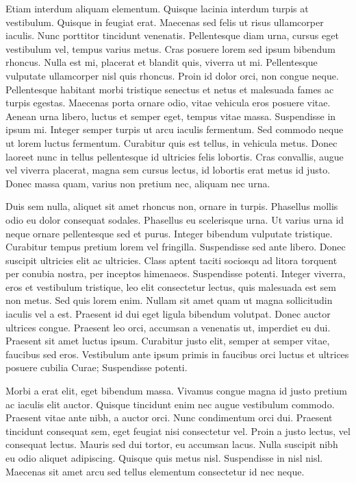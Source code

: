 Etiam interdum aliquam elementum.
Quisque lacinia interdum turpis at vestibulum.
Quisque in feugiat erat.
Maecenas sed felis ut risus ullamcorper iaculis.
Nunc porttitor tincidunt venenatis.
Pellentesque diam urna, cursus eget vestibulum vel, tempus varius metus.
Cras posuere lorem sed ipsum bibendum rhoncus.
Nulla est mi, placerat et blandit quis, viverra ut mi.
Pellentesque vulputate ullamcorper nisl quis rhoncus.
Proin id dolor orci, non congue neque.
Pellentesque habitant morbi tristique senectus et netus et malesuada fames ac turpis egestas.
Maecenas porta ornare odio, vitae vehicula eros posuere vitae.
Aenean urna libero, luctus et semper eget, tempus vitae massa.
Suspendisse in ipsum mi.
Integer semper turpis ut arcu iaculis fermentum.
Sed commodo neque ut lorem luctus fermentum.
Curabitur quis est tellus, in vehicula metus.
Donec laoreet nunc in tellus pellentesque id ultricies felis lobortis.
Cras convallis, augue vel viverra placerat, magna sem cursus lectus, id lobortis erat metus id justo.
Donec massa quam, varius non pretium nec, aliquam nec urna.

Duis sem nulla, aliquet sit amet rhoncus non, ornare in turpis.
Phasellus mollis odio eu dolor consequat sodales.
Phasellus eu scelerisque urna.
Ut varius urna id neque ornare pellentesque sed et purus.
Integer bibendum vulputate tristique.
Curabitur tempus pretium lorem vel fringilla.
Suspendisse sed ante libero.
Donec suscipit ultricies elit ac ultricies.
Class aptent taciti sociosqu ad litora torquent per conubia nostra, per inceptos himenaeos.
Suspendisse potenti.
Integer viverra, eros et vestibulum tristique, leo elit consectetur lectus, quis malesuada est sem non metus.
Sed quis lorem enim.
Nullam sit amet quam ut magna sollicitudin iaculis vel a est.
Praesent id dui eget ligula bibendum volutpat.
Donec auctor ultrices congue.
Praesent leo orci, accumsan a venenatis ut, imperdiet eu dui.
Praesent sit amet luctus ipsum.
Curabitur justo elit, semper at semper vitae, faucibus sed eros.
Vestibulum ante ipsum primis in faucibus orci luctus et ultrices posuere cubilia Curae; Suspendisse potenti.

Morbi a erat elit, eget bibendum massa.
Vivamus congue magna id justo pretium ac iaculis elit auctor.
Quisque tincidunt enim nec augue vestibulum commodo.
Praesent vitae ante nibh, a auctor orci.
Nunc condimentum orci dui.
Praesent tincidunt consequat sem, eget feugiat nisi consectetur vel.
Proin a justo lectus, vel consequat lectus.
Mauris sed dui tortor, eu accumsan lacus.
Nulla suscipit nibh eu odio aliquet adipiscing.
Quisque quis metus nisl.
Suspendisse in nisl nisl.
Maecenas sit amet arcu sed tellus elementum consectetur id nec neque.

